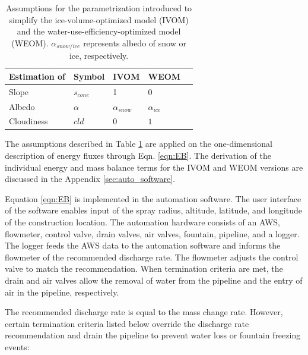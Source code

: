 \begin{table}[htb]
	\centering
	\caption{Assumptions for the parametrization introduced to simplify the ice-volume-optimized model (IVOM) and
		the water-use-efficiency-optimized model (WEOM). $\alpha_{snow/ice}$ represents albedo of snow or ice, respectively.}
	\label{tab:assumptions}
	\begin{tabular}{|lllll|}
		\toprule
		\textbf{Estimation of}          & \textbf{Symbol} & \textbf{IVOM}   & \textbf{WEOM}  &                       \\\midrule
		\multicolumn{1}{|l}{Slope}      & $s_{cone}$      & 1               & 0              & \multicolumn{1}{l|}{} \\
		\multicolumn{1}{|l}{Albedo}     & $\alpha$        & $\alpha_{snow}$ & $\alpha_{ice}$ & \multicolumn{1}{l|}{} \\
		\multicolumn{1}{|l}{Cloudiness} & $cld$           & $0$             & $1$            & \multicolumn{1}{l|}{} \\\bottomrule
	\end{tabular}
\end{table}

The assumptions described in Table \ref{tab:assumptions} are applied on the one-dimensional description of
energy fluxes through Eqn. \ref{eqn:EB}. The derivation of the individual energy and mass balance terms for the
\ac{IVOM} and \ac{WEOM} versions are discussed in the Appendix \ref{sec:auto_software}.

Equation \ref{eqn:EB} is implemented in the automation software. The user interface of the software enables
input of the spray radius, altitude, latitude, and longitude of the construction location. The automation
hardware consists of an AWS, flowmeter, control valve, drain valves, air valves, fountain, pipeline, and a
logger. The logger feeds the AWS data to the automation software and informs the flowmeter of the recommended discharge rate. The flowmeter adjusts the control valve to match the recommendation. When termination
criteria are met, the drain and air valves allow the removal of water from the pipeline and the entry of
air in the pipeline, respectively.

The recommended discharge rate is equal to the mass change rate. However, certain termination criteria listed
below override the discharge rate recommendation and drain the pipeline to prevent water loss or fountain
freezing events:

